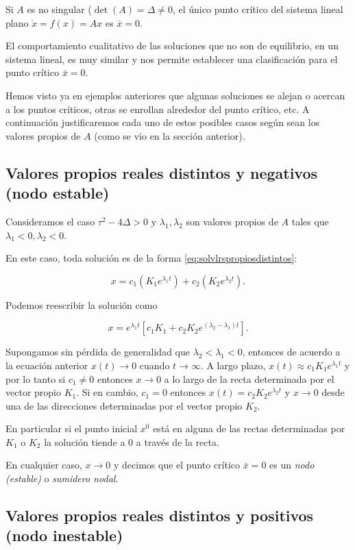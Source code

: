 \documentclass[11pt]{book}
\theoremstyle{definition}
\numberwithin{definition}{section}
\theoremstyle{theorem}
\numberwithin{theorem}{section}
\numberwithin{lemma}{section}
\numberwithin{corollary}{section}
\theoremstyle{plain}
\numberwithin{example}{section}
\begin{document}
Si $A$ es no singular ($\det(A) = \Delta \neq 0$, el único punto crítico del sistema lineal plano $\dot{x} = f(x) = Ax$ es $\bar{x} = 0$.

El comportamiento cualitativo de las soluciones que no son de equilibrio, en un sistema lineal, es muy similar y nos permite establecer una clasificación para el punto crítico $\bar{x} = 0$.

Hemos visto ya en ejemplos anteriores que algunas soluciones se alejan o acercan a los puntos críticos, otras se enrollan alrededor del punto crítico, etc. A continuación justificaremos cada uno de estos posibles casos según sean los valores propios de $A$ (como se vio en la sección anterior).

\subsection{Valores propios reales distintos y negativos (nodo estable)}
Consideramos el caso $\tau^2 - 4\Delta > 0$ y $\lambda_1, \lambda_2$ son valores propios de $A$ tales que $\lambda_1 < 0, \lambda_2 < 0$.

En este caso, toda solución es de la forma \ref{eq:solvlrspropiosdistintos}:

$$ x = c_1(K_1 e^{\lambda_1 t}) + c_2(K_2 e^{\lambda_2 t}). $$

Podemos reescribir la solución como

$$ x = e^{\lambda_1 t} [ c_1 K_1 + c_2K_2 e^{(\lambda_2 - \lambda_1)t} ].$$

Supongamos sin pérdida de generalidad que $\lambda_2 < \lambda_1 < 0$, entonces de acuerdo a la ecuación anterior $x(t) \to 0$ cuando $t \to \infty$.
A largo plazo, $x(t) \approx c_1K_1e^{\lambda_1 t}$ y por lo tanto si $c_1 \neq 0$ entonces $x \to 0$ a lo largo de la recta determinada por el vector propio $K_1$.
Si en cambio, $c_1 = 0$ entonces $x(t) = c_2 K_2 e^{\lambda_2 t}$ y $x \to 0$ desde una de las direcciones determinadas por el vector propio $K_2$.

En particular si el punto inicial $x^0$ está en alguna de las rectas determinadas por $K_1$ o $K_2$ la solución tiende a 0 a través de la recta.

En cualquier caso, $x \to 0$ y decimos que el punto crítico $\bar{x} = 0$ es un \emph{nodo (estable)} o \emph{sumidero nodal}.


\subsection{Valores propios reales distintos y positivos (nodo inestable)}
\end{document}

